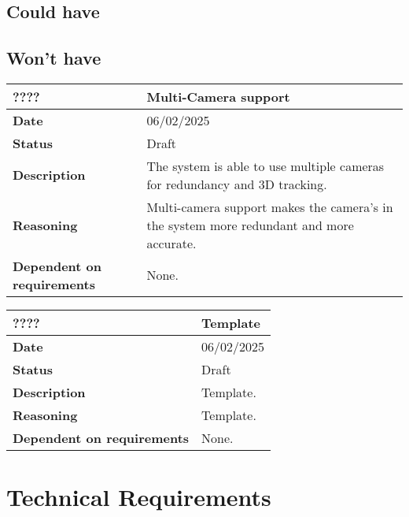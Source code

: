 \documentclass{article}
\begin{document}
\subsection{Could have}

\subsection{Won't have}
\begin{table}[H]
    \renewcommand{\arraystretch}{1.3}
    \begin{tabular}{|l|p{10cm}|}
        \hline
        \rowcolor{gray!50}
        \textbf{????} & \textbf{Multi-Camera support} \\ \hline
        \textbf{Date} & 06/02/2025 \\ \hline
        \textbf{Status} & Draft \\ \hline
        \textbf{Description} & The system is able to use multiple cameras for redundancy and 3D tracking. \\ \hline
        \textbf{Reasoning} & Multi-camera support makes the camera's in the system more redundant and more accurate. \\ \hline
        \textbf{Dependent on requirements} & None. \\ \hline
    \end{tabular}
\end{table}

\begin{table}[H]
    \renewcommand{\arraystretch}{1.3}
    \begin{tabular}{|l|p{10cm}|}
        \hline
        \rowcolor{gray!50}
        \textbf{????} & \textbf{Template} \\ \hline
        \textbf{Date} & 06/02/2025 \\ \hline
        \textbf{Status} & Draft \\ \hline
        \textbf{Description} & Template. \\ \hline
        \textbf{Reasoning} & Template. \\ \hline
        \textbf{Dependent on requirements} & None. \\ \hline
    \end{tabular}
\end{table}

\newpage

\section{Technical Requirements}
\end{document}
